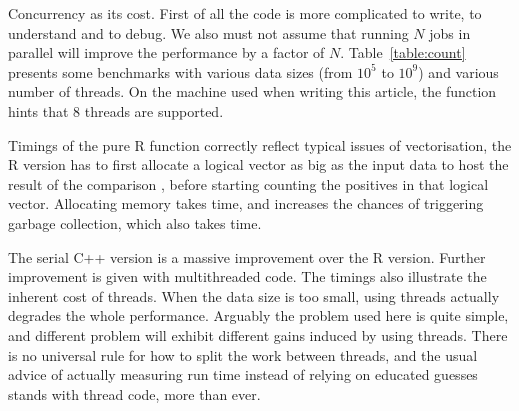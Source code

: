 Concurrency as its cost. First of all the code is more complicated
to write, to understand and to debug. We also must not assume that 
running $N$ jobs in parallel will improve the performance by a factor 
of $N$. Table~\ref{table:count} presents some benchmarks with various 
data sizes (from $10^5$ to $ 10^9$) and various number of threads. 
On the machine used when writing this article, 
the  function hints that 8 threads
are supported. 
           
Timings of the pure R function correctly reflect typical issues of 
vectorisation, the R version has to first allocate a logical vector
as big as the input data to host the result of the comparison , before
starting counting the positives in that logical vector. Allocating 
memory takes time, and increases the chances of triggering garbage collection, 
which also takes time. 

The serial C++ version is a massive improvement over the R version. Further 
improvement is given with multithreaded code. The timings also illustrate 
the inherent cost of threads. When the data size is too small, using threads
actually degrades the whole performance. Arguably the problem used here
is quite simple, and different problem will exhibit different gains 
induced by using threads. There is no universal rule for how to split
the work between threads, and the usual advice of actually measuring 
run time instead of relying on educated guesses stands with thread code, more than 
ever. 


